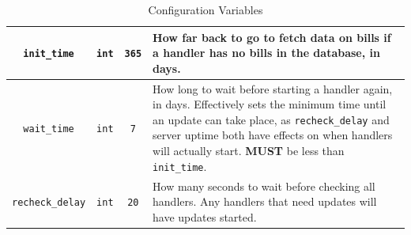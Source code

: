 \documentclass{article}
\begin{document}
\begin{table}[h]
\begin{tabularx}{\textwidth}{c c c X}
        \hline 
        \verb"init_time" & \verb"int" & \verb"365" & How far back to go to fetch data on bills if a handler has no bills in the database, in days. \\ 
        \hline 
        \verb"wait_time" & \verb"int" & \verb"7" & How long to wait before starting a handler again, in days. Effectively sets the minimum time until an update can take place, as \verb"recheck_delay" and server uptime both have effects on when handlers will actually start. \textbf{MUST} be less than \verb"init_time". \\ 
        \hline 
        \verb"recheck_delay" & \verb"int" & \verb"20" & How many seconds to wait before checking all handlers. Any handlers that need updates will have updates started. \\ 
        \hline 
    \end{tabularx}
    \def\arraystretch{1}
    \caption{Configuration Variables}
    \label{table:cfg}
\end{table}
\end{document}
